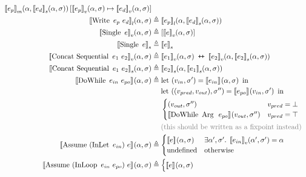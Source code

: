 \begin{align*}
\denotefsub{m}{e_p}{\targ,\denotefs{e_d}{\targ,\tmem}}[\denotefv{e_p}{\targ,\tmem} \mapsto \denotefv{e_d}{\targ,\tmem}]\\
%
\denotefsub{l}{\bop{Write}{e_p}{e_d}}{\targ,\tmem} &\eqdef
\denotefsub{l}{e_p}{\targ,\denotefs{e_d}{\targ,\tmem}}\\
%
\denotefv{\uop{Single}e}{\targ,\tmem} &\eqdef [\denotefv{e}{\targ,\tmem}]\\
\denotestate{\uop{Single}e} &\eqdef \denotestate{e} \\
%
\denotefv{\bop{Concat\ Sequential}{e_1}{e_2}}{\targ,\tmem} &\eqdef
\append{\denotefv{e_1}{\targ,\tmem}}{\denotefv{e_2}{\targ,\denotefs{e_2}{\targ,\tmem}}}\\
%
\denotefs{\bop{Concat\ Sequential}{e_1}{e_2}}{\targ,\tmem} &\eqdef
\denotefs{e_2}{\targ,\denotefs{e_1}{\targ,\tmem}}\\
%
\denotef{\bop{DoWhile}{e_{in}}{e_{po}}}{\targ,\tmem} &\eqdef
\mathrm{let}\ (v_{in},\tmem') = \denotef{e_{in}}{\targ,\tmem}\ \mathrm{in}\\
&\hspace{1.3em}\mathrm{let}\ ((v_{pred}, v_{out}), \tmem'') = \denotef{e_{po}}{v_{in},\tmem'}\ \mathrm{in}\\
&\hspace{1.3em}\begin{cases}
   (v_{out}, \tmem'')
   & v_{pred} = \bot\\
   \denotef{\bop{DoWhile}{\mathrm{Arg}\ }{e_{po}}}{v_{out},\tmem''}
   & v_{pred} = \top\\
\end{cases}\\
&\hspace{1.3em}\text{\color{gray}(this should be written as a fixpoint instead)}\\
\denotef{\bop{Assume}{(\uop{InLet}{e_{in}})}{e}}{\targ,\tmem} &\eqdef
\begin{cases}
  \denotef{e}{\targ,\tmem} & \exists \targ', \tmem' . \; \denotefv{e_{in}}{\targ',\tmem'} = \targ \\
  \mathrm{undefined} & \text{otherwise}
\end{cases}\\
%
\denotef{\bop{Assume}{(\bop{InLoop}{e_{in}}{e_{po}})}{e}}{\targ,\tmem} &\eqdef
\begin{cases}
  \denotef{e}{\targ,\tmem} &
    \begin{aligned}

\end{aligned}
\end{cases}
\end{align*}
